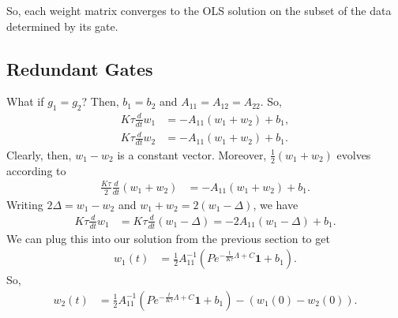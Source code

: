 \documentclass{article}
\begin{document}
So, each weight matrix converges to the OLS solution on the subset of the data determined by its gate.


\subsection{Redundant Gates}
What if $g_1 = g_2$?
Then, $b_1 = b_2$ and $A_{11} = A_{12} = A_{22}$.
So,
\begin{align}
  K \tau \frac{d}{dt} w_1 &= - A_{11} (w_1 + w_2) + b_1 , \\
  K \tau \frac{d}{dt} w_2 &= - A_{11} (w_1 + w_2) + b_1 .
\end{align}
Clearly, then, $w_1 - w_2$ is a constant vector.
Moreover, $\frac{1}{2} (w_1 + w_2)$ evolves according to
\begin{align}
  \frac{K \tau}{2} \frac{d}{dt} (w_1 + w_2) &= - A_{11} (w_1 + w_2) + b_1.
\end{align}
Writing $2 \Delta = w_1 - w_2$ and $w_1 + w_2 = 2 (w_1 - \Delta)$, we have
\begin{align}
  K \tau \frac{d}{dt} w_1
  &= K \tau \frac{d}{dt} (w_1 - \Delta)
  = - 2 A_{11} (w_1 - \Delta) + b_1.
\end{align}
We can plug this into our solution from the previous section to get
\begin{align}
  w_1(t) &= \frac{1}{2} A_{11}^{-1} \left( P e^{-\frac{t}{K \tau} \Lambda + C} \mathbf{1} + b_1 \right).
\end{align}
So,
\begin{align}
  w_2(t) &= \frac{1}{2} A_{11}^{-1} \left( P e^{-\frac{t}{K \tau} \Lambda + C} \mathbf{1} + b_1 \right) - (w_1(0) - w_2(0)).
\end{align}
\end{document}
